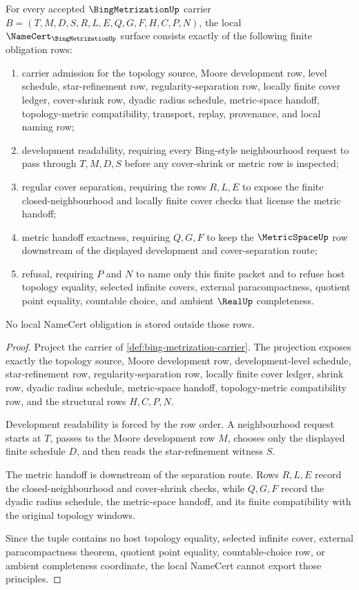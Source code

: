 \begin{theorem}
\label{thm:bing-metrization-namecert-obligations}
For every accepted $\BingMetrizationUp$ carrier $B=(T,M,D,S,R,L,E,Q,G,F,H,C,P,N)$, the local $\NameCert_{\BingMetrizationUp}$ surface consists exactly of the following finite obligation rows:
\begin{enumerate}
\item carrier admission for the topology source, Moore development row, level schedule, star-refinement row, regularity-separation row, locally finite cover ledger, cover-shrink row, dyadic radius schedule, metric-space handoff, topology-metric compatibility, transport, replay, provenance, and local naming row;
\item development readability, requiring every Bing-style neighbourhood request to pass through $T,M,D,S$ before any cover-shrink or metric row is inspected;
\item regular cover separation, requiring the rows $R,L,E$ to expose the finite closed-neighbourhood and locally finite cover checks that license the metric handoff;
\item metric handoff exactness, requiring $Q,G,F$ to keep the $\MetricSpaceUp$ row downstream of the displayed development and cover-separation route;
\item refusal, requiring $P$ and $N$ to name only this finite packet and to refuse host topology equality, selected infinite covers, external paracompactness, quotient point equality, countable choice, and ambient $\RealUp$ completeness.
\end{enumerate}
No local NameCert obligation is stored outside those rows.
\end{theorem}
\begin{proof}
Project the carrier of \autoref{def:bing-metrization-carrier}. The projection exposes exactly the topology source, Moore development row, development-level schedule, star-refinement row, regularity-separation row, locally finite cover ledger, shrink row, dyadic radius schedule, metric-space handoff, topology-metric compatibility row, and the structural rows $H,C,P,N$.

Development readability is forced by the row order. A neighbourhood request starts at $T$, passes to the Moore development row $M$, chooses only the displayed finite schedule $D$, and then reads the star-refinement witness $S$.

The metric handoff is downstream of the separation route. Rows $R,L,E$ record the closed-neighbourhood and cover-shrink checks, while $Q,G,F$ record the dyadic radius schedule, the metric-space handoff, and its finite compatibility with the original topology windows.

Since the tuple contains no host topology equality, selected infinite cover, external paracompactness theorem, quotient point equality, countable-choice row, or ambient completeness coordinate, the local NameCert cannot export those principles.
\end{proof}

